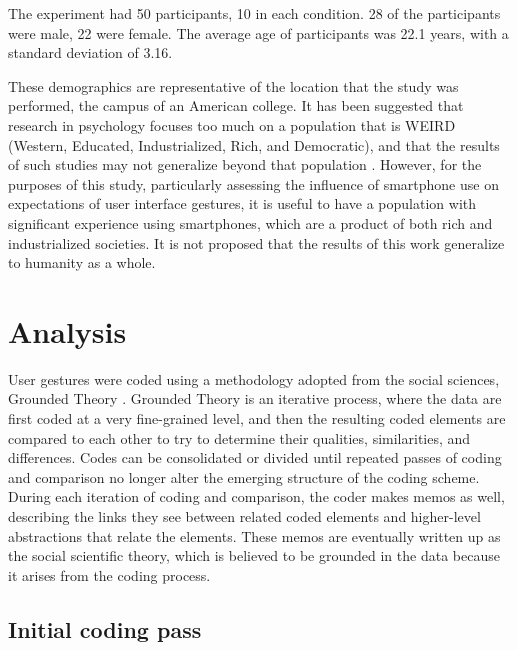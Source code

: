 The experiment had 50 participants, 10 in each condition. 28 of the participants were male, 22 were female. The average age of participants was 22.1 years, with a standard deviation of 3.16. 

These demographics are representative of the location that the study was performed, the campus of an American college. 
It has been suggested that research in psychology focuses too much on a population that is WEIRD (Western, Educated, Industrialized, Rich, and Democratic), and that the results of such studies may not generalize beyond that population \citep{arnett2008neglected}.
However, for the purposes of this study, particularly assessing the influence of smartphone use on expectations of user interface gestures, it is useful to have a population with significant experience using smartphones, which are a product of both rich and industrialized societies. 
It is not proposed that the results of this work generalize to humanity as a whole.  

\section{Analysis} \label{section:Analysis}

User gestures were coded using a methodology adopted from the social sciences, Grounded Theory \citep{glaser2017discovery}.
Grounded Theory is an iterative process, where the data are first coded at a very fine-grained level, and then the resulting coded elements are compared to each other to try to determine their qualities, similarities, and differences. 
Codes can be consolidated or divided until repeated passes of coding and comparison no longer alter the emerging structure of the coding scheme. 
During each iteration of coding and comparison, the coder makes memos as well, describing the links they see between related coded elements and higher-level abstractions that relate the elements. 
These memos are eventually written up as the social scientific theory, which is believed to be grounded in the data because it arises from the coding process. 

\subsection{Initial coding pass} \label{section:Initial_coding_pass}

